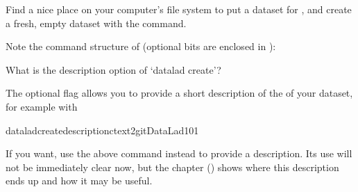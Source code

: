 \sphinxAtStartPar
Find a nice place on your computer’s file system to put a dataset for ,
and create a fresh, empty dataset with the  command.

\sphinxAtStartPar
Note the command structure of  (optional bits are enclosed in \sphinxcode{\sphinxupquote{{[} {]}}}):

\begin{sphinxVerbatim}[commandchars=\\\{\}]
  \PYG{p}{[} \PYG{p}{]} \PYG{p}{[}  \PYG{p}{]} 
\end{sphinxVerbatim}

\ignorespaces {}\label{\detokenize{basics/101-101-create:createdescription}}\begin{findoutmore}[label={index-1}, before title={\thetcbcounter\ }, check odd page=true]{What is the description option of ‘datalad create’?}
\label{\detokenize{basics/101-101-create:index-1}}

\sphinxAtStartPar
The optional  flag allows you to provide a short description of
the  of your dataset, for example with

\begin{sphinxVerbatim}[commandchars=\\\{\}]
dataladcreate\PYGZhy{}\PYGZhy{}description\PYGZhy{}ctext2gitDataLad\PYGZhy{}101
\end{sphinxVerbatim}

\sphinxAtStartPar
If you want, use the above command instead to provide a description. Its use will not be immediately clear now, but the chapter
{\hyperref[\detokenize{basics/basics-collaboration:chapter-collaboration}]{}} () shows where this description
ends up and how it may be useful.


\end{findoutmore}


